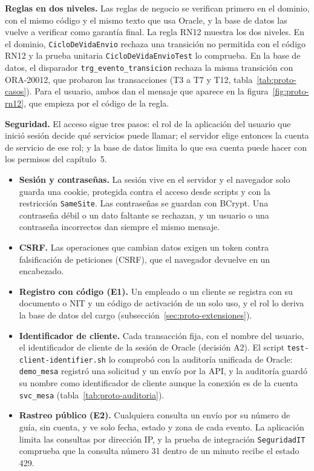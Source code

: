 \textbf{Reglas en dos niveles.} Las reglas de negocio se verifican primero en el
dominio, con el mismo código y el mismo texto que usa Oracle, y la base de
datos las vuelve a verificar como garantía final. La regla RN12 muestra los
dos niveles. En el dominio, \texttt{CicloDeVidaEnvio} rechaza una
transición no permitida con el código RN12 y la prueba unitaria
\texttt{CicloDeVidaEnvioTest} lo comprueba. En la base de datos, el disparador
\texttt{trg\_evento\_transicion} rechaza la misma transición con ORA-20012,
que probaron las transacciones (T3 a T7 y T12,
tabla~\ref{tab:proto-casos}). Para el usuario, ambos dan el mensaje que
aparece en la figura~\ref{fig:proto-rn12}, que empieza por el código de la
regla.

\textbf{Seguridad.} El acceso sigue tres pasos: el rol de la aplicación del
usuario que inició sesión decide qué servicios puede llamar; el servidor elige
entonces la cuenta de servicio de ese rol; y la base de datos limita lo que esa
cuenta puede hacer con los permisos del capítulo~5.

\begin{itemize}[itemsep=2pt]
  \item \textbf{Sesión y contraseñas.} La sesión vive en el servidor y el
        navegador solo guarda una cookie, protegida contra el acceso desde
        scripts y con la restricción \texttt{SameSite}. Las contraseñas se
        guardan con BCrypt. Una contraseña débil o un dato faltante se
        rechazan, y un usuario o una contraseña incorrectos dan siempre el
        mismo mensaje.
  \item \textbf{CSRF.} Las operaciones que cambian datos exigen un
        token contra falsificación de peticiones (CSRF), que el navegador
        devuelve en un encabezado.
  \item \textbf{Registro con código (E1).} Un empleado o un cliente se
        registra con su documento o NIT y un código de activación de un solo
        uso, y el rol lo deriva la base de datos del cargo
        (subsección~\ref{sec:proto-extensiones}).
  \item \textbf{Identificador de cliente.} Cada transacción fija, con el
        nombre del usuario, el identificador de cliente de la sesión de Oracle
        (decisión A2). El script
        \texttt{test-client-identifier.sh} lo comprobó
        con la auditoría unificada de Oracle: \texttt{demo\_mesa} registró una
        solicitud y un envío por la API, y la auditoría guardó su nombre como
        identificador de cliente aunque la conexión es de la cuenta
        \texttt{svc\_mesa} (tabla~\ref{tab:proto-auditoria}).
  \item \textbf{Rastreo público (E2).} Cualquiera consulta un envío por su
        número de guía, sin cuenta, y ve solo fecha, estado y zona de cada
        evento. La aplicación limita las consultas por dirección IP, y la
        prueba de integración \texttt{SeguridadIT} comprueba que la consulta
        número 31 dentro de un minuto recibe el estado 429.
\end{itemize}

